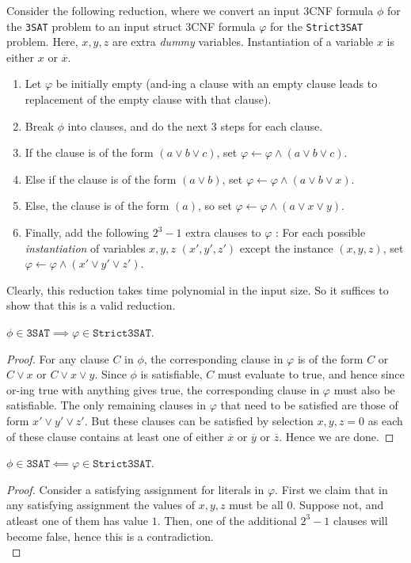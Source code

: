 \begin{soln}
    Consider the following reduction, where we convert an input 3CNF formula $\phi$ for the \texttt{3SAT} problem to an input struct 3CNF formula $\varphi$ for the \texttt{Strict3SAT} problem. Here, $x, y, z$ are extra \emph{dummy} variables. Instantiation of a variable $x$ is either $x$ or $\overline x$.
    \begin{enumerate}
        \item Let $\varphi$ be initially empty (and-ing a clause with an empty clause leads to replacement of the empty clause with that clause).
        \item Break $\phi$ into clauses, and do the next 3 steps for each clause.
        \item If the clause is of the form $(a \lor b \lor c)$, set $\varphi \gets \varphi \land (a \lor b \lor c)$.
        \item Else if the clause is of the form $(a \lor b)$, set $\varphi \gets \varphi \land (a \lor b \lor x)$.
        \item Else, the clause is of the form $(a)$, so set $\varphi \gets \varphi \land (a \lor x \lor y)$.
        \item Finally, add the following $2^3 - 1$ extra clauses to $\varphi$ : For each possible \emph{instantiation} of variables $x, y, z$ $(x', y', z')$ except the instance $(x, y, z)$,  set $\varphi \gets \varphi \land (x' \lor y' \lor z')$.
    \end{enumerate}
    Clearly, this reduction takes time polynomial in the input size. So it suffices to show that this is a valid reduction.\nl
    \begin{claim}
        $\phi \in \texttt{3SAT} \implies \varphi \in \texttt{Strict3SAT}$.
    \end{claim}
    \begin{proof}
        For any clause $C$ in $\phi$, the corresponding clause in $\varphi$ is of the form $C$ or $C \lor x$ or $C \lor x \lor y$. Since $\phi$ is satisfiable, $C$ must evaluate to true, and hence
        since or-ing true with anything gives true, the corresponding clause in $\varphi$ must also be satisfiable. The only remaining clauses in $\varphi$ that need to be satisfied are those of form $x' \lor y' \lor z'$. But these clauses can be satisfied by selection $x, y, z = 0$ as each of these clause contains at least one of either $\overline x$ or $\overline y$ or $\overline z$. Hence we are done.
    \end{proof}
    \begin{claim}
        $\phi \in \texttt{3SAT} \impliedby \varphi \in \texttt{Strict3SAT}$.
    \end{claim}
    \begin{proof}
        Consider a satisfying assignment for literals in $\varphi$. First we claim that in any satisfying assignment the values of $x, y, z$ must be all $0$. Suppose not, and atleast one of them has value $1$. Then, one of the additional $2^3-1$ clauses will become false, hence this is a contradiction.\\
        

\end{proof}
\end{soln}
